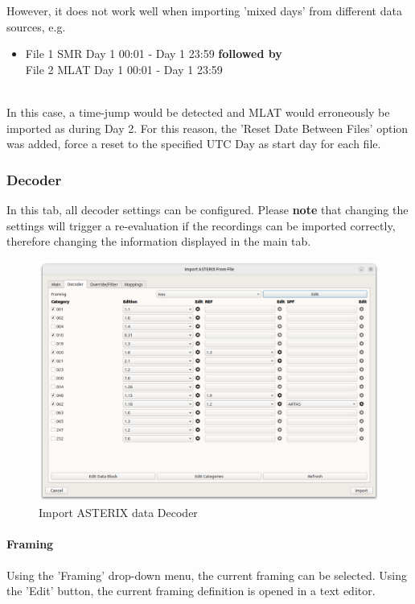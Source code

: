However, it does not work well when importing 'mixed days' from different data sources, e.g. 
\begin{itemize}
\item File 1 SMR Day 1 00:01 - Day 1 23:59 \textbf{followed by} \\{} File 2 MLAT Day 1 00:01 - Day 1 23:59
\end{itemize}
\ \\

 In this case, a time-jump would be detected and MLAT would erroneously be imported as during Day 2. For this reason, the 'Reset Date Between Files' option was added, force a reset to the specified UTC Day as start day for each file. \\


\subsubsection{Decoder}

In this tab, all decoder settings can be configured. Please \textbf{note} that changing the settings will trigger a re-evaluation if the recordings can be imported correctly, 
therefore changing the information displayed in the main tab.

\begin{figure}[H]
  \center
    \hspace*{-0.5cm}
    \includegraphics[width=17cm]{figures/asterix_import_data_decoder.png}
  \caption{Import ASTERIX data Decoder}
\end{figure}

\paragraph{Framing}
Using the 'Framing' drop-down menu, the current framing can be selected. Using the 'Edit' button, the current framing definition is opened in a text editor.


